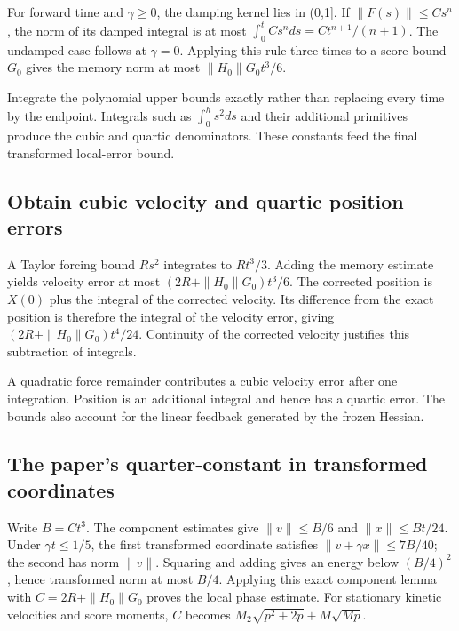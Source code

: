 \documentclass[11pt,a4paper]{report}
\begin{document}
For forward time and \(\gamma \ge 0\), the damping kernel lies in (0,1]. If \(\|F(s)\|\le Cs^{n}\), the norm of its damped integral is at most \(\int _{0}^{t}Cs^{n}ds=Ct^{n+1}/(n+1)\). The undamped case follows at \(\gamma =0\). Applying this rule three times to a score bound \(G_{0}\) gives the memory norm at most \(\|H_{0}\|G_{0}t^{3}/6\).



Integrate the polynomial upper bounds exactly rather than replacing every time by the endpoint. Integrals such as \(\int_0^h s^2ds\) and their additional primitives produce the cubic and quartic denominators. These constants feed the final transformed local-error bound.

\subsection{\texorpdfstring{Obtain cubic velocity and quartic position errors}{Obtain cubic velocity and quartic position errors}}
\label{report-step-KineticLangevin-SecondOrderLocal-lean-5}


A Taylor forcing bound \(Rs^{2}\) integrates to \(Rt^{3}/3\). Adding the memory estimate yields velocity error at most \((2R+\|H_{0}\|G_{0})t^{3}/6\). The corrected position is \(X(0)\) plus the integral of the corrected velocity. Its difference from the exact position is therefore the integral of the velocity error, giving \((2R+\|H_{0}\|G_{0})t^{4}/24\). Continuity of the corrected velocity justifies this subtraction of integrals.



A quadratic force remainder contributes a cubic velocity error after one integration. Position is an additional integral and hence has a quartic error. The bounds also account for the linear feedback generated by the frozen Hessian.

\subsection{\texorpdfstring{The paper’s quarter-constant in transformed coordinates}{The paper’s quarter-constant in transformed coordinates}}
\label{report-step-KineticLangevin-SecondOrderLocal-lean-6}


Write \(B=Ct^{3}\). The component estimates give \(\|v\|\le B/6\) and \(\|x\|\le Bt/24\). Under \(\gamma t\le 1/5\), the first transformed coordinate satisfies \(\|v+\gamma x\|\le 7B/40\); the second has norm \(\|v\|\). Squaring and adding gives an energy below \((B/4)^{2}\), hence transformed norm at most \(B/4\). Applying this exact component lemma with \(C=2R+\|H_{0}\|G_{0}\) proves the local phase estimate. For stationary kinetic velocities and score moments, \(C\) becomes \(M_{2}\sqrt{p^{2}+2p}+M\sqrt{Mp}\).
\end{document}
